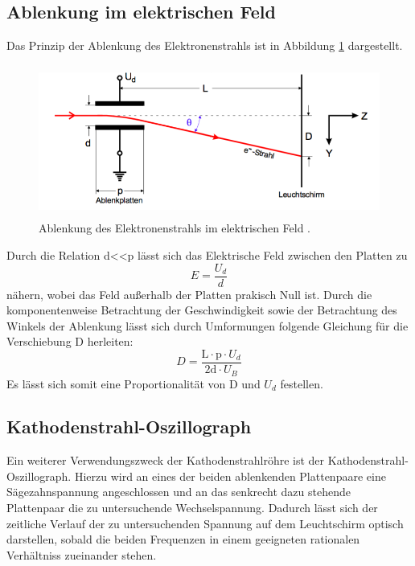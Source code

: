 \subsection{Ablenkung im elektrischen Feld}
Das Prinzip der Ablenkung des Elektronenstrahls ist in Abbildung \ref{fig:abl1}
dargestellt.
\begin{figure}[H]
  \centering
  \includegraphics[height=5cm]{Ablenkung.png}
  \caption{Ablenkung des Elektronenstrahls im elektrischen Feld \cite{skript1}.}
  \label{fig:abl1}
\end{figure}
Durch die Relation d<<p lässt sich das Elektrische Feld zwischen den Platten zu
\begin{equation}
  E = \frac{U_d}{d}
  \label{eqn:efeld}
\end{equation}
nähern, wobei das Feld außerhalb der Platten prakisch Null ist.
Durch die komponentenweise Betrachtung der Geschwindigkeit sowie der Betrachtung
des Winkels der Ablenkung lässt sich durch Umformungen folgende Gleichung für
die Verschiebung D herleiten:
\begin{equation}
   D = \frac{\text{L} \cdot \text{p} \cdot U_d}{2\text{d} \cdot U_B}
   \label{eqn:verschiebung}
\end{equation}
Es lässt sich somit eine Proportionalität von D und $U_d$ festellen.

\subsection{Kathodenstrahl-Oszillograph}
Ein weiterer Verwendungszweck der Kathodenstrahlröhre ist der Kathodenstrahl-Oszillograph.
Hierzu wird an eines der beiden ablenkenden Plattenpaare eine Sägezahnspannung angeschlossen
und an das senkrecht dazu stehende Plattenpaar die zu untersuchende Wechselspannung.
Dadurch lässt sich der zeitliche Verlauf der zu untersuchenden Spannung auf
dem Leuchtschirm optisch darstellen, sobald die beiden Frequenzen in einem
geeigneten rationalen Verhältniss zueinander stehen.

